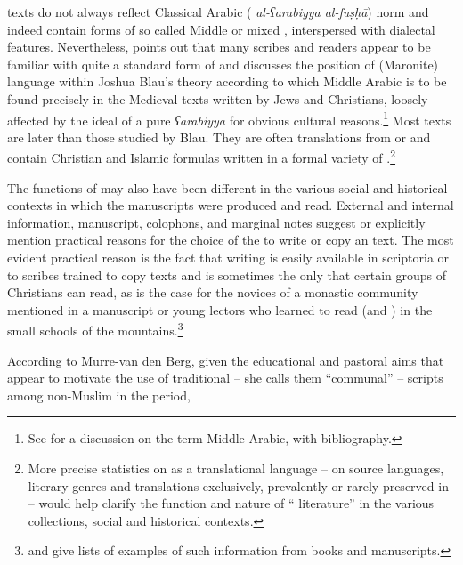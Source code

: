 \documentclass[output=paper,colorlinks,citecolor=brown,arabfont,syriacfont]{langscibook}
\begin{document}
 texts do not always reflect Classical Arabic ( \textit{al-ʕarabiyya al-fuṣḥā}) norm and indeed contain forms of so called Middle or mixed , interspersed with dialectal features. Nevertheless, \citet[187--190]{del_rio_sanchez2004} points out that many  scribes and readers appear to be familiar with quite a standard form of  and discusses the position of (Maronite)  language within Joshua Blau's theory according to which Middle Arabic is to be found precisely in the Medieval texts written by Jews and Christians, loosely affected by the ideal of a pure \textit{ʕarabiyya} for obvious cultural reasons.\footnote{%
See \citet[1920]{murre-van_den_berg2020} for a discussion on the term Middle Arabic, with bibliography.} Most  texts are later than those studied by Blau. They are often translations from  or  and contain Christian and Islamic formulas written in a formal variety of .\footnote{%
More precise statistics on  as a translational language -- on source languages, literary genres and  translations exclusively, prevalently or rarely preserved in  -- would help clarify the function and nature of `` literature'' in the various collections, social and historical contexts.}

The functions of  may also have been different in the various social and historical contexts in which the manuscripts were produced and read. External and internal information, manuscript, colophons, and marginal notes suggest or explicitly mention practical reasons for the choice of the   to write or copy an  text. The most evident practical reason is the fact that  writing is easily available in scriptoria or to scribes trained to copy  texts and is sometimes the only  that certain groups of Christians can read, as is the case for the novices of a monastic community mentioned in a manuscript or young lectors who learned to read  (and ) in the small schools of the mountains.\footnote{%
\citet[122]{moukarzel2014a} and \citet[226--227]{mccollum2014} give lists of examples of such information from books and manuscripts.}


According to Murre-van den Berg, given the educational and pastoral aims that appear to motivate the use of traditional -- she calls them ``communal'' -- scripts among non-Muslim  in the  period,
\end{document}
